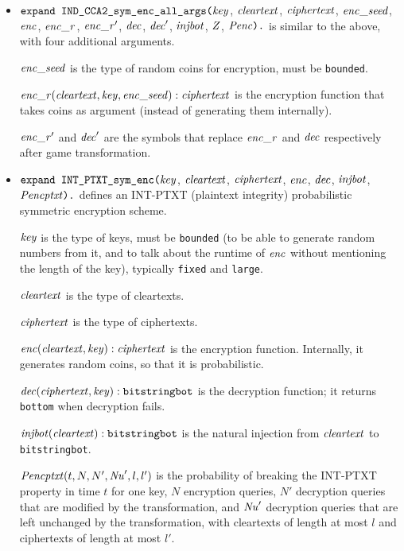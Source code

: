 \documentclass{article}
\begin{document}
\begin{itemize}
\item $\texttt{expand IND\_CCA2\_sym\_enc\_all\_args(}\mathit{key}$,
$  \mathit{cleartext}$, $\mathit{ciphertext}$, $\mathit{enc\_seed}$, $\mathit{enc}$, $\mathit{enc\_r}$, $\mathit{enc\_r}'$,
$  \mathit{dec}$, $\mathit{dec}'$, $\mathit{injbot}$, $\mathit{Z}$, $\mathit{Penc}\texttt{).}$ is similar to the above,
  with four additional arguments. 

  $\mathit{enc\_seed}$ is the type of random coins for encryption, must be \texttt{bounded}.

  $\mathit{enc\_r}(\mathit{cleartext}, \mathit{key}, \mathit{enc\_seed}): \mathit{ciphertext}$ is the encryption function that takes coins as argument (instead of generating them internally).

  $\mathit{enc\_r}'$ and $\mathit{dec}'$ are the symbols that replace $\mathit{enc\_r}$ and $\mathit{dec}$ respectively after game transformation.


\item $\texttt{expand INT\_PTXT\_sym\_enc(}\mathit{key}$,
$  \mathit{cleartext}$, $\mathit{ciphertext}$, $\mathit{enc}$,
$  \mathit{dec}$, $\mathit{injbot}$, $\mathit{Pencptxt}\texttt{).}$ defines an INT-PTXT (plaintext integrity)
  probabilistic symmetric encryption scheme.

   $\mathit{key}$ is the type of keys, must be \texttt{bounded} (to be able to generate random numbers from it, and to talk about the runtime of $\mathit{enc}$ without mentioning the length of the key), typically \texttt{fixed} and \texttt{large}.

   $\mathit{cleartext}$ is the type of cleartexts.

   $\mathit{ciphertext}$ is the type of ciphertexts.

   $\mathit{enc}(\mathit{cleartext}, \mathit{key}): \mathit{ciphertext}$ is the encryption function. Internally, it generates random coins, so that it is probabilistic.

   $\mathit{dec}(\mathit{ciphertext}, \mathit{key}): \texttt{bitstringbot}$ is the
  decryption function; it returns \texttt{bottom} when decryption
  fails.

   $\mathit{injbot}(\mathit{cleartext}): \texttt{bitstringbot}$ is the natural
  injection from $\mathit{cleartext}$ to \texttt{bitstringbot}.

  $\mathit{Pencptxt}(t, N, N', \mathit{Nu}', l, l')$ is the probability of breaking the
  INT-PTXT property in time $t$ for one key, $N$ encryption queries, $N'$
  decryption queries that are modified by the transformation, and 
  $\mathit{Nu}'$ decryption queries that are left unchanged by the transformation,
  with cleartexts of length at most $l$ and
  ciphertexts of length at most $l'$.


\end{itemize}
\end{document}
